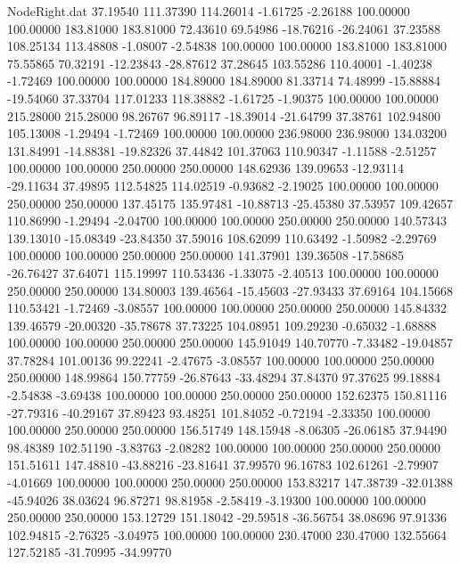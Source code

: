 \begin{filecontents}{NodeRight.dat}
  37.19540  111.37390  114.26014    -1.61725   -2.26188  100.00000  100.00000  183.81000  183.81000   72.43610   69.54986  -18.76216  -26.24061
  37.23588  108.25134  113.48808    -1.08007   -2.54838  100.00000  100.00000  183.81000  183.81000   75.55865   70.32191  -12.23843  -28.87612
  37.28645  103.55286  110.40001    -1.40238   -1.72469  100.00000  100.00000  184.89000  184.89000   81.33714   74.48999  -15.88884  -19.54060
  37.33704  117.01233  118.38882    -1.61725   -1.90375  100.00000  100.00000  215.28000  215.28000   98.26767   96.89117  -18.39014  -21.64799
  37.38761  102.94800  105.13008    -1.29494   -1.72469  100.00000  100.00000  236.98000  236.98000  134.03200  131.84991  -14.88381  -19.82326
  37.44842  101.37063  110.90347    -1.11588   -2.51257  100.00000  100.00000  250.00000  250.00000  148.62936  139.09653  -12.93114  -29.11634
  37.49895  112.54825  114.02519    -0.93682   -2.19025  100.00000  100.00000  250.00000  250.00000  137.45175  135.97481  -10.88713  -25.45380
  37.53957  109.42657  110.86990    -1.29494   -2.04700  100.00000  100.00000  250.00000  250.00000  140.57343  139.13010  -15.08349  -23.84350
  37.59016  108.62099  110.63492    -1.50982   -2.29769  100.00000  100.00000  250.00000  250.00000  141.37901  139.36508  -17.58685  -26.76427
  37.64071  115.19997  110.53436    -1.33075   -2.40513  100.00000  100.00000  250.00000  250.00000  134.80003  139.46564  -15.45603  -27.93433
  37.69164  104.15668  110.53421    -1.72469   -3.08557  100.00000  100.00000  250.00000  250.00000  145.84332  139.46579  -20.00320  -35.78678
  37.73225  104.08951  109.29230    -0.65032   -1.68888  100.00000  100.00000  250.00000  250.00000  145.91049  140.70770   -7.33482  -19.04857
  37.78284  101.00136   99.22241    -2.47675   -3.08557  100.00000  100.00000  250.00000  250.00000  148.99864  150.77759  -26.87643  -33.48294
  37.84370   97.37625   99.18884    -2.54838   -3.69438  100.00000  100.00000  250.00000  250.00000  152.62375  150.81116  -27.79316  -40.29167
  37.89423   93.48251  101.84052    -0.72194   -2.33350  100.00000  100.00000  250.00000  250.00000  156.51749  148.15948   -8.06305  -26.06185
  37.94490   98.48389  102.51190    -3.83763   -2.08282  100.00000  100.00000  250.00000  250.00000  151.51611  147.48810  -43.88216  -23.81641
  37.99570   96.16783  102.61261    -2.79907   -4.01669  100.00000  100.00000  250.00000  250.00000  153.83217  147.38739  -32.01388  -45.94026
  38.03624   96.87271   98.81958    -2.58419   -3.19300  100.00000  100.00000  250.00000  250.00000  153.12729  151.18042  -29.59518  -36.56754
  38.08696   97.91336  102.94815    -2.76325   -3.04975  100.00000  100.00000  230.47000  230.47000  132.55664  127.52185  -31.70995  -34.99770

\end{filecontents}
